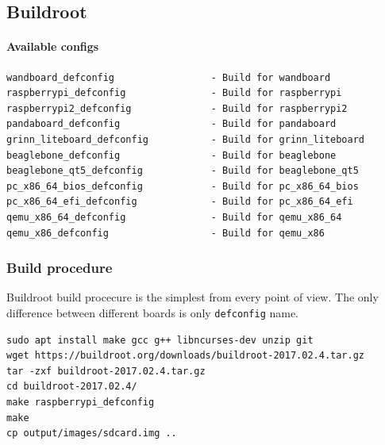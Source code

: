 \documentclass[printmode]{mgr}
\begin{document}
\subsection{Buildroot}

\paragraph{Available configs}

\begin{verbatim}
wandboard_defconfig                 - Build for wandboard
raspberrypi_defconfig               - Build for raspberrypi
raspberrypi2_defconfig              - Build for raspberrypi2
pandaboard_defconfig                - Build for pandaboard
grinn_liteboard_defconfig           - Build for grinn_liteboard
beaglebone_defconfig                - Build for beaglebone
beaglebone_qt5_defconfig            - Build for beaglebone_qt5
pc_x86_64_bios_defconfig            - Build for pc_x86_64_bios
pc_x86_64_efi_defconfig             - Build for pc_x86_64_efi
qemu_x86_64_defconfig               - Build for qemu_x86_64
qemu_x86_defconfig                  - Build for qemu_x86
\end{verbatim}

\subsubsection{Build procedure}

Buildroot build procecure is the simplest from every point of view.
The only difference between different boards is only \verb|defconfig| name.

\begin{lstlisting}
sudo apt install make gcc g++ libncurses-dev unzip git
wget https://buildroot.org/downloads/buildroot-2017.02.4.tar.gz
tar -zxf buildroot-2017.02.4.tar.gz
cd buildroot-2017.02.4/
make raspberrypi_defconfig
make
cp output/images/sdcard.img ..
\end{lstlisting}





\end{document}
